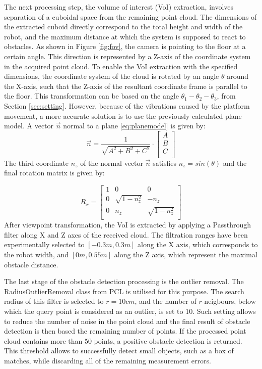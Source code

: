 The next processing step, the volume of interest (VoI) extraction, involves separation of a cuboidal space from the remaining point cloud. The dimensions of the extracted cuboid directly correspond to the total height and width of the robot, and the maximum distance at which the system is supposed to react to obstacles. As shown in Figure \ref{fig:fov}, the camera is pointing to the floor at a certain angle. This direction is represented by a Z-axis of the coordinate system in the acquired point cloud. To enable the VoI extraction with the specified dimensions, the coordinate system of the cloud is rotated by an angle $\theta$ around the X-axis, such that the Z-axis of the resultant coordinate frame is parallel to the floor. This transformation can be based on the angle $\theta_1 - \theta_2 - \theta_3$, from Section \ref{sec:setting}. However, because of the vibrations caused by the platform movement, a more accurate solution is to use the previously calculated plane model. A vector $\vec{n}$ normal to a plane \ref{eq:planemodel} is given by:
\begin{equation}
 \vec{n} = \frac{1}{\sqrt{A^2+B^2+C^2}} \cdot \left[
\begin{array}{c}
A\\
B\\
C\\
\end{array}
\right] 
\end{equation}
The third coordinate $n_z$ of the normal vector $\vec{n}$ satisfies $n_z = sin(\theta)$ and the final rotation matrix is given by:

\begin{equation}
R_x=\left[\begin{array}{ccc}
      1 & 0 & 0  \\
      0 & \sqrt{1 - n_z^2} & -n_z  \\
      0 & n_z & \sqrt{1 - n_z^2}  \\
    \end{array}\right]
\end{equation}
After viewpoint transformation, the VoI is extracted by applying a Passthrough filter along X and Z axes of the received cloud. The filtration ranges have been experimentally selected to $[-0.3m, 0.3m]$ along the X axis, which corresponds to the robot width, and $[0m, 0.55m]$ along the Z axis, which represent the maximal obstacle distance.

The last stage of the obstacle detection processing is the outlier removal. The RadiusOutlierRemoval class from PCL is utilised for this purpose. The search radius of this filter is selected to $r = 10cm$, and the number of $r$-neigbours, below which the query point is considered as an outlier, is set to $10$. Such setting allows to reduce the number of noise in the point cloud and the final result of obstacle detection is then based the remaining number of points. If the processed point cloud contains more than $50$ points, a positive obstacle detection is returned. This threshold allows to successfully detect small objects, such as a box of matches, while discarding all of the remaining measurement errors.

